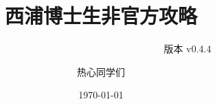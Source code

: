 \documentclass[lang=cn,12pt,newtx]{elegantbook}
\title{西浦博士生非官方攻略}
\subtitle{~~~~~~~~~~~~~~~~~~~~~~~~~~~~~~~~~~~~版本 v0.4.4}
\author{热心同学们}
\date{\today}
\begin{document}
\maketitle
\frontmatter


\tableofcontents
\mainmatter






% 
% 


\backmatter	




\makeatletter
\makeatother
\end{document}
